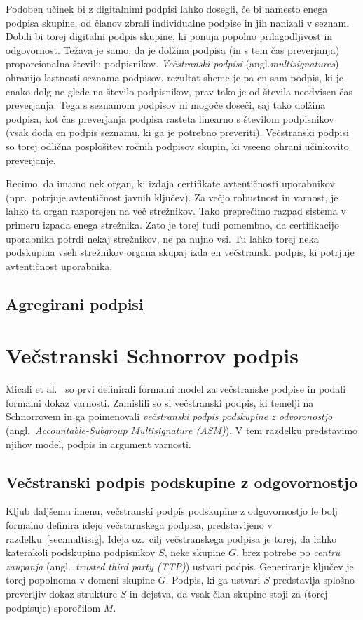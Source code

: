 \documentclass[isrm2, tisk]{fmfdelo}
\begin{document}
Podoben učinek bi z digitalnimi podpisi lahko dosegli, če bi namesto enega podpisa skupine, od članov 
zbrali individualne podpise in jih nanizali v seznam. Dobili bi torej digitalni podpis skupine, ki 
ponuja popolno prilagodljivost in odgovornost. Težava je samo, da je dolžina podpisa (in s tem čas 
preverjanja) proporcionalna številu podpisnikov. \textit{Večstranski podpisi} (angl.\textit{multisignatures})
ohranijo lastnosti seznama podpisov, rezultat sheme je pa en sam podpis, ki je enako dolg ne glede 
na število podpisnikov, prav tako je od števila neodvisen čas preverjanja. Tega s seznamom podpisov 
ni mogoče doseči, saj tako dolžina podpisa, kot čas preverjanja podpisa rasteta linearno s številom 
podpisnikov (vsak doda en podpis seznamu, ki ga je potrebno preveriti). Večstranski podpisi so torej 
odlična posplošitev ročnih podpisov skupin, ki vseeno ohrani učinkovito preverjanje.

\begin{primer}
    Recimo, da imamo nek organ, ki izdaja certifikate avtentičnosti uporabnikov (npr.\ potrjuje 
    avtentičnost javnih ključev). Za večjo robustnost in varnost, je lahko ta organ razporejen 
    na več strežnikov. Tako preprečimo razpad sistema v primeru izpada enega strežnika. Zato je 
    torej tudi pomembno, da certifikacijo uporabnika potrdi nekaj strežnikov, ne pa nujno vsi. 
    Tu lahko torej neka podskupina vseh strežnikov organa skupaj izda en večstranski podpis, ki 
    potrjuje avtentičnost uporabnika.
\end{primer}

\subsection{Agregirani podpisi}

\section{Večstranski Schnorrov podpis}
Micali et al.~\cite{micali2001asm} so prvi definirali formalni model za večstranske podpise in podali 
formalni dokaz varnosti. Zamislili so si večstranski podpis, ki temelji na Schnorrovem in ga poimenovali 
\textit{večstranski podpis podskupine z odvoronostjo} (angl.\ \textit{Accountable-Subgroup Multisignature 
(ASM)}). V tem razdelku predstavimo njihov model, podpis in argument varnosti.

\subsection{Večstranski podpis podskupine z odgovornostjo}
Kljub daljšemu imenu, večstranski podpis podskupine z odgovornostjo le bolj formalno definira idejo 
večstarnskega podpisa, predstavljeno v razdelku~\ref{sec:multisig}. Ideja oz.\ cilj večstranskega 
podpisa je torej, da lahko katerakoli podskupina podpisnikov $S$, neke skupine $G$, brez potrebe po 
\textit{centru zaupanja} (angl.\ \textit{trusted third party (TTP)}) ustvari podpis. 
Generiranje ključev je torej popolnoma v domeni skupine $G$. Podpis, ki ga ustvari $S$ predstavlja 
splošno preverljiv dokaz strukture $S$ in dejstva, da vsak član skupine stoji za (torej podpisuje) 
sporočilom $M$.
\end{document}
